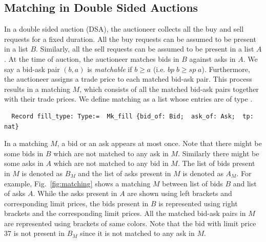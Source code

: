 \documentclass[a4paper,UKenglish,cleveref, autoref]{lipics-v2019}
\begin{document}
\subsection{Matching in Double Sided Auctions}
In a double sided auction (DSA), the auctioneer collects all the buy and sell requests for a fixed duration. All the buy requests can be assumed to be present in a list $B$. Similarly, all the sell requests can be assumed to be present in a list $A$. At the time of auction, the auctioneer matches bids in $B$ against asks in $A$. We say a bid-ask pair $(b, a)$ is \emph{matchable} if $b \ge a$ (i.e. $bp \; b \ge sp \; a$).  Furthermore, the auctioneer assigns a trade price to each matched bid-ask pair. This  process results in  a matching $M$, which consists of all the matched bid-ask pairs together with their trade prices. We define matching as a list whose entries are of type .
\begin{verbatim}
  Record fill_type: Type:=  Mk_fill {bid_of: Bid;  ask_of: Ask;  tp: nat} 
\end{verbatim}

In a matching $M$, a bid or an ask appears at most once. Note that there might be some bids in $B$ which are not matched to any ask in $M$. Similarly there might be some asks in $A$ which are not matched to any bid in $M$. The list of bids present in $M$ is denoted as $B_{M}$ and the list of asks present in $M$ is denoted as $A_M$. For example, Fig.~\ref{fig:matching} shows a matching $M$ between list of bids $B$ and list of asks $A$.  While the asks present in $A$ are shown using left brackets and corresponding limit prices, the bids present in $B$ is represented using right brackets and the corresponding limit prices.  All the matched bid-ask pairs in $M$ are  represented using  brackets of same colors. Note that the bid with limit price $37$ is not present in $B_M$ since it is not matched to any ask in $M$.  
\end{document}
